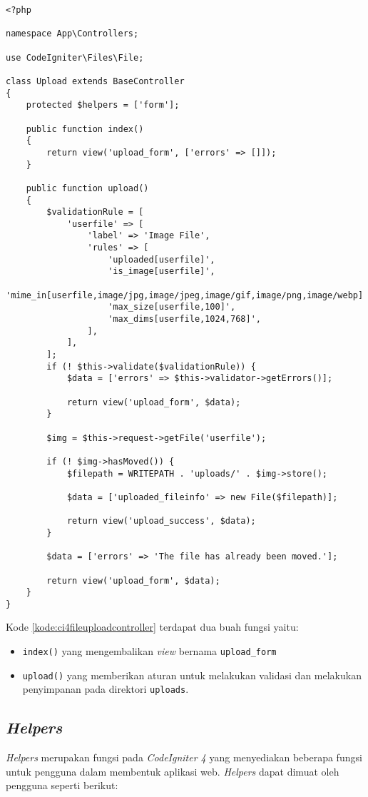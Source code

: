 \begin{lstlisting}[caption=Contoh kode \textit{controller} untuk melakukan validasi dan penyimpanan. ,label=kode:ci4fileuploadcontroller]
<?php

namespace App\Controllers;

use CodeIgniter\Files\File;

class Upload extends BaseController
{
    protected $helpers = ['form'];

    public function index()
    {
        return view('upload_form', ['errors' => []]);
    }

    public function upload()
    {
        $validationRule = [
            'userfile' => [
                'label' => 'Image File',
                'rules' => [
                    'uploaded[userfile]',
                    'is_image[userfile]',
                    'mime_in[userfile,image/jpg,image/jpeg,image/gif,image/png,image/webp]',
                    'max_size[userfile,100]',
                    'max_dims[userfile,1024,768]',
                ],
            ],
        ];
        if (! $this->validate($validationRule)) {
            $data = ['errors' => $this->validator->getErrors()];

            return view('upload_form', $data);
        }

        $img = $this->request->getFile('userfile');

        if (! $img->hasMoved()) {
            $filepath = WRITEPATH . 'uploads/' . $img->store();

            $data = ['uploaded_fileinfo' => new File($filepath)];

            return view('upload_success', $data);
        }

        $data = ['errors' => 'The file has already been moved.'];

        return view('upload_form', $data);
    }
}
\end{lstlisting}
Kode \ref{kode:ci4fileuploadcontroller} terdapat dua buah fungsi yaitu:
\begin{itemize}
\item \verb|index()| yang mengembalikan \textit{view} bernama \texttt{upload\_form}
\item \verb|upload()| yang memberikan aturan untuk melakukan validasi dan melakukan penyimpanan pada direktori \texttt{uploads}.
\end{itemize}

\subsection{\textit{Helpers}}
\textit{Helpers} merupakan fungsi pada \textit{CodeIgniter 4} yang menyediakan beberapa fungsi untuk pengguna dalam membentuk aplikasi web. \textit{Helpers} dapat dimuat oleh pengguna seperti berikut:

